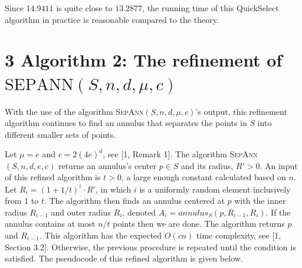\documentclass[12pt,english,]{article}
\newcommand{\pnt}[1]{{\scriptstyle#1}}
\begin{document}
Since \(14.9411\) is quite close to \(13.2877\), the running time of
this QuickSelect algorithm in practice is reasonable compared to the
theory.

\hypertarget{section3}{%
\section{\texorpdfstring{3 \enspace Algorithm 2: The refinement of
\(\mathrm{S\pnt{EP}A\pnt{NN}}(S,n,d,\mu,c)\)}{3 Algorithm 2: The refinement of \textbackslash{}mathrm\{S\textbackslash{}pnt\{EP\}A\textbackslash{}pnt\{NN\}\}(S,n,d,\textbackslash{}mu,c)}}\label{section3}}

With the use of the algorithm \textsc{SepAnn$(S,n,d,\mu,c)$}'s output,
this refinement algorithm continues to find an annulus that separates
the points in \(S\) into different smaller sets of points.

Let \(\mu = e\) and \(c = 2(4e)^d\), see {[}1, Remark 1{]}. The
algorithm \textsc{SepAnn$(S,n,d,e,c)$} returns an annulus's center
\(p \in S\) and its radius, \(R'>0\). An input of this refined algorithm
is \(t > 0\), a large enough constant calculated based on \(n\). Let
\(R_i = (1+1/t)^i\cdot R'\), in which \(i\) is a uniformly random
element inclusively from \(1\) to \(t\). The algorithm then finds an
annulus centered at \(p\) with the inner radius \(R_{i-1}\) and outer
radius \(R_{i}\), denoted \(A_i = annulus_S(p, R_{i-1}, R_i)\). If the
annulus contains at most \(n/t\) points then we are done. The algorithm
returns \(p\) and \(R_{i-1}\). This algorithm has the expected \(O(cn)\)
time complexity, see {[}1, Section 3.2{]}. Otherwise, the previous
procedure is repeated until the condition is satisfied. The pseudocode
of this refined algorithm is given below.
\end{document}
